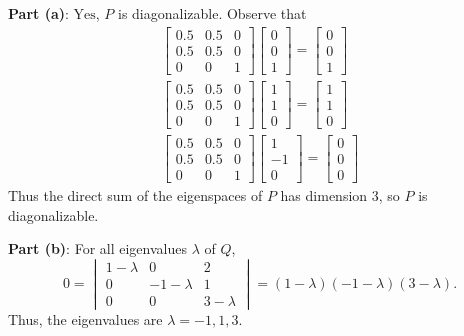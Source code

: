 \documentclass[11pt]{article}
\begin{document}
\textbf{Part (a)}: $\boxed{\text{Yes}}$, $P$ is diagonalizable. Observe that
\begin{align*}
	\begin{bmatrix} 0.5 & 0.5 & 0 \\ 0.5 & 0.5 & 0 \\ 0 & 0 & 1 \end{bmatrix} \begin{bmatrix} 0 \\ 0 \\ 1 \end{bmatrix} = \begin{bmatrix} 0 \\ 0 \\ 1 \end{bmatrix} \\
	\begin{bmatrix} 0.5 & 0.5 & 0 \\ 0.5 & 0.5 & 0 \\ 0 & 0 & 1 \end{bmatrix} \begin{bmatrix} 1 \\ 1 \\ 0 \end{bmatrix} = \begin{bmatrix} 1 \\ 1 \\ 0 \end{bmatrix} \\
	\begin{bmatrix} 0.5 & 0.5 & 0 \\ 0.5 & 0.5 & 0 \\ 0 & 0 & 1 \end{bmatrix} \begin{bmatrix} 1 \\ -1 \\ 0 \end{bmatrix} = \begin{bmatrix} 0 \\ 0 \\ 0 \end{bmatrix}
\end{align*}
Thus the direct sum of the eigenspaces of $P$ has dimension $3$, so $P$ is diagonalizable.

\textbf{Part (b)}: For all eigenvalues $\lambda$ of $Q$, 
\[
	0 = \begin{vmatrix} 1 - \lambda & 0 & 2 \\ 0 & -1 - \lambda & 1 \\ 0 & 0 & 3 - \lambda \end{vmatrix} = (1 - \lambda)(-1 - \lambda)(3 - \lambda).
\]
Thus, the eigenvalues are $\boxed{\lambda = -1, 1, 3}$.
\end{document}

